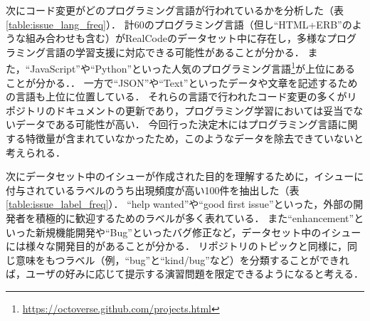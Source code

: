 次にコード変更がどのプログラミング言語が行われているかを分析した（表\ref{table:issue_lang_freq}）．
計60のプログラミング言語（但し``HTML+ERB''のような組み合わせも含む）がRealCodeのデータセット中に存在し，多様なプログラミング言語の学習支援に対応できる可能性があることが分かる．
また，``JavaScript''や``Python''といった人気のプログラミング言語\footnote{\url{https://octoverse.github.com/projects.html}}が上位にあることが分かる．．
一方で``JSON''や``Text''といったデータや文章を記述するための言語も上位に位置している．
それらの言語で行われたコード変更の多くがリポジトリのドキュメントの更新であり，プログラミング学習においては妥当でないデータである可能性が高い．
今回行った決定木にはプログラミング言語に関する特徴量が含まれていなかったため，このようなデータを除去できていないと考えられる．

次にデータセット中のイシューが作成された目的を理解するために，イシューに付与されているラベルのうち出現頻度が高い100件を抽出した（表\ref{table:issue_label_freq}）．
``help wanted''や``good first issue''といった，外部の開発者を積極的に歓迎するためのラベルが多く表れている．
また``enhancement''といった新規機能開発や``Bug''といったバグ修正など，データセット中のイシューには様々な開発目的があることが分かる．
リポジトリのトピックと同様に，同じ意味をもつラベル（例，``bug''と``kind/bug''など）を分類することができれば，ユーザの好みに応じて提示する演習問題を限定できるようになると考える．



